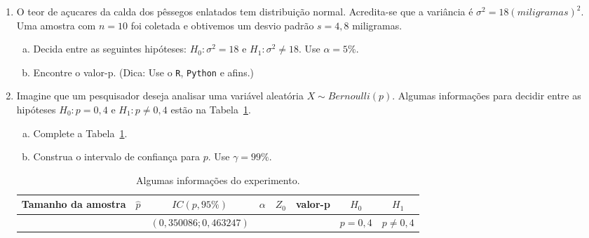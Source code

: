 \documentclass[12pt, a4paper]{article}
\begin{document}
\begin{enumerate}
	\item O teor de açucares da calda dos pêssegos enlatados tem distribuição normal. Acredita-se que a variância é $\sigma^2 = 18 (miligramas)^2$. Uma amostra com $n=10$ foi coletada e obtivemos um desvio padrão $s = 4,8$ miligramas.
	\begin{enumerate}[(a)]
		\item Decida entre as seguintes hipóteses: $H_0: \sigma^2  = 18$ e $H_1: \sigma^2 \neq 18$. Use $\alpha = 5\%$.
		\item Encontre o valor-p. (Dica: Use o \texttt{R}, \texttt{Python} e afins.)
	\end{enumerate} 

	\item Imagine que um pesquisador deseja analisar uma variável aleatória $X \sim Bernoulli(p)$. Algumas informações para decidir entre as hipóteses $H_0: p = 0,4$ e $H_1: p \neq 0,4$ estão na Tabela~\ref{tab:bilateral-tab-prop}.
	\begin{enumerate}[(a)]
		\item Complete a Tabela~\ref{tab:bilateral-tab-prop}.
		\item Construa o intervalo de confiança para $p$. Use $\gamma=99\%$.
	\end{enumerate}
	\begin{table}[htbp]
		\centering
		\begin{tabular}{c|c|c|c|c|c|c|c}
			\toprule[0.05cm]
			Tamanho da amostra & $\hat{p}$ & $IC(p, 95\%)$ & $\alpha$ & $Z_0$ & valor-p & $H_0$ & $H_1$\\ \midrule[0.05cm]
			& & $(0,350086; 0,463247)$ & & & & $p=0,4$ & $p \neq 0,4$ \\ \bottomrule[0.05cm]
		\end{tabular}
		\caption{Algumas informações do experimento.}
		\label{tab:bilateral-tab-prop}
	\end{table}


\end{enumerate}
\end{document}
